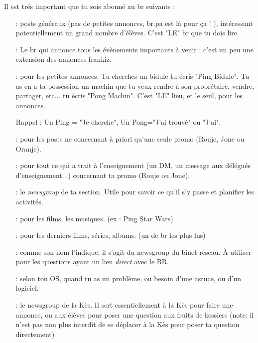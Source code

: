 Il est trés important  que tu sois abonné au br suivants :
\begin{itemize}
\item[\ngname{br.eleves} :] posts généraux (pas de petites annonces, br.pa est là pour ça ! ), intéressant potentiellement un grand nombre d'élèves. C'est "LE" br que tu dois lire.

\item[\ngname{br.eleves.evenements} :] Le br qui annonce tous les évènements importants à venir : c'est un peu une extension des annonces frankiz.
	 
\item[\ngname{br.pa} :] pour les petites annonces. Tu cherches un bidule tu écris "Ping Bidule". Tu as en a ta possession un machin que tu veux rendre à son proprétaire, vendre, partager, etc... tu écris "Pong Machin". C'est "LE" lieu, et le seul, pour les annonces.

\medskip

Rappel : Un Ping = "Je cherche", Un Pong="J'ai trouvé" ou "J'ai".

\medskip


\item[\ngname{br.promo.ta\_promo} :] pour les posts ne concernant à priori qu'une seule promo (Rouje, Jone ou Oranje).
	 
 \item[\ngname{br.enseignement.*} :] pour tout ce qui a trait à l'enseignement (un DM, un message aux délégués d'enseignement...) concernant ta promo (Rouje ou Jone).
 
 \item[\ngname{br.section.ta\_section\_sportive} :] le \emph{newsgroup} de ta section.                                        Utile pour savoir ce qu'il s'y passe et planifier les activités.

\item[\ngname{br.informatique.media.request} :] pour les films, les musiques. (ex : Ping Star Wars)

\item[\ngname{br.informatique.nouveautés} :] pour les derniers films, séries, albums. (un de br les plus lus)

\item[\ngname{br.binet.br} :] comme son nom l'indique, il s'agit du newsgroup du binet réseau. À utiliser pour les questions ayant un lien \emph{direct} avec le BR.

 \item[\ngname{br.informatique.windows/linux/mac} :] selon ton OS, quand tu as un problème, ou besoin d'une astuce, ou d'un logiciel.

 \item[\ngname{br.kes} :] le newsgroup de la Kès. Il sert essentiellement à la Kès pour faire une annonce, ou aux élèves pour poser une question aux fruits de kessiers (note: il n'est pas non plus interdit de se déplacer à la Kès pour poser ta question directement)

\end{itemize}

